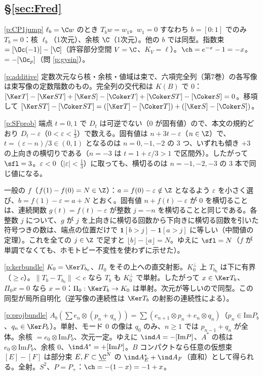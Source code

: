 \subsection*{\S\ref{sec:Fred}}
\begin{sol}{\ref{p:CP1jump}}
$\ell_b=\C w$ のとき $T_bw=w_1$。$w_1=0$ すなわち $b=[0:1]$ でのみ $T_b=0$：核 $\ell_b$（1次元）、余核 $\C$（1次元）。他の $b$ では同型。指数束 $=[\Oc(-1)]-[\C]$（許容部分空間 $V=\C$、$K_V=\ell$）。$\ch=e^{-x}-1=-x$。$=-[\Oc_p]$（問 \ref{p:gysin}）。
\end{sol}
\begin{sol}{\ref{p:additive}}
定数次元なら核・余核・値域は束で、六項完全列（第7巻）の各写像は束写像の定数階数のもの。完全列の交代和は $K(B)$ で $0$：$[\Ker T]-[\Ker ST]+[\Ker S]-[\Coker T]+[\Coker ST]-[\Coker S]=0$。移項して $[\Ker ST]-[\Coker ST]=([\Ker T]-[\Coker T])+([\Ker S]-[\Coker S])$。
\end{sol}
\begin{sol}{\ref{p:SFprob}}
端点 $t=0,1$ で $D_t$ は可逆でない（$0$ が固有値）ので、本文の規約どおり $D_t-\varepsilon$（$0<\varepsilon<\frac13$）で数える。固有値は $n+3t-\varepsilon$（$n\in\Z$）で、$t=(\varepsilon-n)/3\in(0,1)$ となるのは $n=0,-1,-2$ の 3 つ、いずれも傾き $+3$ の上向きの横切りである（$n=-3$ は $t=1+\varepsilon/3>1$ で区間外）。したがって $\sfl=3$。$\varepsilon<0$（$|\varepsilon|<\frac13$）に取っても、横切るのは $n=-1,-2,-3$ の 3 本で同じ値になる。

一般の $f$（$f(1)-f(0)=N\in\Z$）：$a=f(0)-\varepsilon\notin\Z$ となるよう $\varepsilon$ を小さく選び、$b=f(1)-\varepsilon=a+N$ とおく。固有値 $n+f(t)-\varepsilon$ が $0$ を横切ることは、連続関数 $g(t)=f(t)-\varepsilon$ が整数 $j=-n$ を横切ることと同じである。各整数 $j$ について、$g$ が $j$ を上向きに横切る回数から下向きに横切る回数を引いた符号つきの数は、端点の位置だけで $\mathbf 1[b>j]-\mathbf 1[a>j]$ に等しい（中間値の定理）。これを全ての $j\in\Z$ で足すと $\lfloor b\rfloor-\lfloor a\rfloor=N$。ゆえに $\sfl=N$（$f$ が単調でなくても、ホモトピー不変性を使わずに示せた）。
\end{sol}
\begin{sol}{\ref{p:kerbundle}}
$K_0=\Ker T_{b_0}$、$\Pi_0$ をその上への直交射影。$K_0^\perp$ 上 $T_{b_0}$ は下に有界（$\ge c$）。$\|T_b-T_{b_0}\|<c$ なら $T_b$ も $K_0^\perp$ で単射。したがって $x\in\Ker T_b$、$\Pi_0x=0$ なら $x=0$：$\Pi_0:\Ker T_b\to K_0$ は単射。次元が等しいので同型。この同型が局所自明化（逆写像の連続性は $\Ker T_b$ の射影の連続性による）。
\end{sol}
\begin{sol}{\ref{p:projbundle}}
$A_b(\sum e_n\otimes(p_n+q_n))=\sum(e_{n+1}\otimes p_n+e_n\otimes q_n)$（$p_n\in\mathrm{Im}P_b$、$q_n\in\Ker P_b$）。単射、モード $0$ の像は $q_0$ のみ、$n\ge1$ では $p_{n-1}+q_n$ が全体。余核 $=e_0\otimes\mathrm{Im}P_b$、次元一定。ゆえに $\ind A=-[\mathrm{Im}P]$、$A^*$ の核は $e_0\otimes\mathrm{Im}P_b$、余核 $0$、$\ind A^*=+[\mathrm{Im}P]$。$B$ コンパクトなら任意の仮想束 $[E]-[F]$ は部分束 $E,F\subset\underline{\C}^N$ の $\ind A_E^*+\ind A_F$（直和）として得られる。全射。$S^2$、$P=P_+$：$\ch=-(1-x)=-1+x$。
\end{sol}
